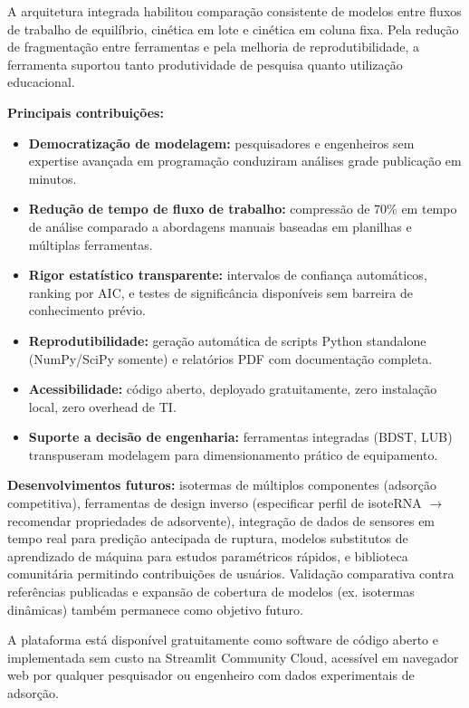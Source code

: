 \documentclass[openany, a4paper, twoside]{article}
\begin{document}
A arquitetura integrada habilitou comparação consistente de modelos entre fluxos de trabalho de equilíbrio, cinética em lote e cinética em coluna fixa. Pela redução de fragmentação entre ferramentas e pela melhoria de reprodutibilidade, a ferramenta suportou tanto produtividade de pesquisa quanto utilização educacional.

\noindent \textbf{Principais contribuições:}

\begin{itemize}
	\item \textbf{Democratização de modelagem:} pesquisadores e engenheiros sem expertise avançada em programação conduziram análises grade publicação em minutos.
	\item \textbf{Redução de tempo de fluxo de trabalho:} compressão de 70\% em tempo de análise comparado a abordagens manuais baseadas em planilhas e múltiplas ferramentas.
	\item \textbf{Rigor estatístico transparente:} intervalos de confiança automáticos, ranking por AIC, e testes de significância disponíveis sem barreira de conhecimento prévio.
	\item \textbf{Reprodutibilidade:} geração automática de scripts Python standalone (NumPy/SciPy somente) e relatórios PDF com documentação completa.
	\item \textbf{Acessibilidade:} código aberto, deployado gratuitamente, zero instalação local, zero overhead de TI.
	\item \textbf{Suporte a decisão de engenharia:} ferramentas integradas (BDST, LUB) transpuseram modelagem para dimensionamento prático de equipamento.
\end{itemize}

\noindent \textbf{Desenvolvimentos futuros:} isotermas de múltiplos componentes (adsorção competitiva), ferramentas de design inverso (especificar perfil de isoteRNA $\to$ recomendar propriedades de adsorvente), integração de dados de sensores em tempo real para predição antecipada de ruptura, modelos substitutos de aprendizado de máquina para estudos paramétricos rápidos, e biblioteca comunitária permitindo contribuições de usuários. Validação comparativa contra referências publicadas e expansão de cobertura de modelos (ex. isotermas dinâmicas) também permanece como objetivo futuro.

A plataforma está disponível gratuitamente como software de código aberto e implementada sem custo na Streamlit Community Cloud, acessível em navegador web por qualquer pesquisador ou engenheiro com dados experimentais de adsorção.
\end{document}
